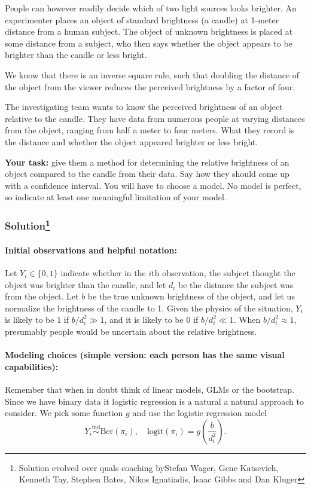 People can however readily decide which of two light sources looks brighter. An experimenter places an object of standard brightness (a candle) at 1-meter distance from a human subject. The object of unknown brightness is placed at some distance from a subject, who then says whether the object
appears to be brighter than the candle or less bright.

We know that there is an inverse square rule, such that doubling the
distance of the object from the viewer reduces the perceived brightness by a
factor of four.

The investigating team wants to know the perceived brightness of an object relative to the candle. They have data from numerous people at varying distances from the object, ranging from half a meter to four meters. What they record is the distance and whether the object appeared brighter or less bright. \newline

\textbf{Your task:} give them a method for determining the relative brightness of
an object compared to the candle from their data. Say how they should come
up with a confidence interval. You will have to choose a model. No model is
perfect, so indicate at least one meaningful limitation of your model.

\subsubsection*{Solution\footnote{Solution evolved over quals coaching byStefan Wager, Gene Katsevich,  Kenneth Tay, Stephen Bates, Nikos Ignatiadis, Isaac Gibbs and Dan Kluger}}

\paragraph{Initial observations and helpful notation:} Let $Y_i \in \{0, 1\}$ indicate whether in the $i$th observation, the subject thought the object was brighter than the candle, and let $d_i$ be the distance the subject was from the object. Let $b$ be the true unknown brightness of the object, and let us normalize the brightness of the candle to 1. Given the physics of the situation, $Y_i$ is likely to be 1 if $b/d_i^2 \gg 1$, and it is likely to be 0 if $b/d_i^2 \ll 1$. When $b/d_i^2 \approx 1$, presumably people would be uncertain about the relative brightness. 

\paragraph{Modeling choices (simple version: each person has the same visual capabilities):} Remember that when in doubt think of linear models, GLMs or the bootstrap. Since we have binary data it logistic regression is a natural a natural approach to consider.
We pick some function $g$ and use the logistic regression model
\begin{equation*}
Y_i \overset{\text{ind}}\sim \text{Ber}(\pi_i), \quad \mathrm{logit}(\pi_i) = g \left(\frac{b}{d_i^2}\right).
\end{equation*}

